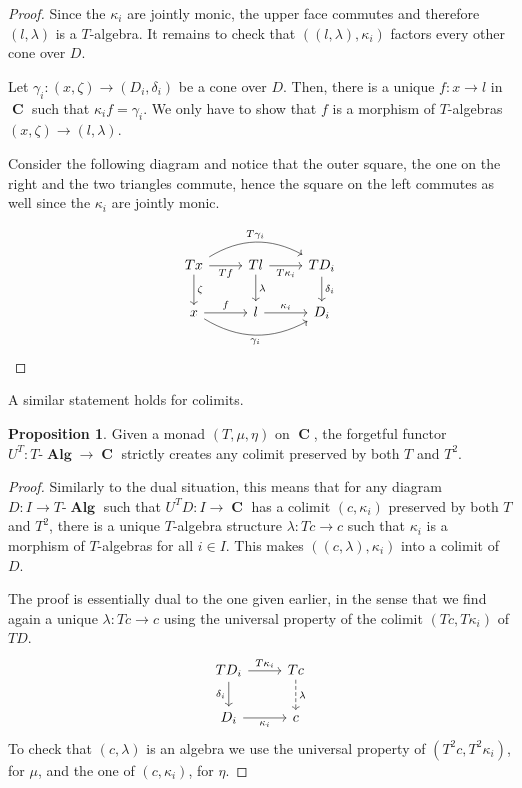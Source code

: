\documentclass[a4paper,11pt,twoside, openany]{book}
\DeclareMathOperator{\Alg}{\mathbf{Alg}}
\DeclareMathOperator{\C}{\mathbf{C}}
\theoremstyle{definition}
\theoremstyle{definition}
\newtheorem{prop}[thm]{Proposition}
\theoremstyle{remark}
\begin{document}
\begin{proof}
		Since the $\kappa_i$ are jointly monic, the upper face commutes and therefore $(l,\lambda)$ is a $T$-algebra. It remains to check that $((l,\lambda),\kappa_i)$ factors every other cone over $D$.
		
		Let $\gamma_i\colon(x,\zeta)\rightarrow (D_i,\delta_i)$ be a cone over $D$. Then, there is a unique $f\colon x\rightarrow l$ in $\C$ such that $\kappa_if=\gamma_i$. We only have to show that $f$ is a morphism of $T$-algebras $(x,\zeta)\rightarrow (l,\lambda)$.
		
		Consider the following diagram and notice that the outer square, the one on the right and the two triangles commute, hence the square on the left commutes as well since the $\kappa_i$ are jointly monic.
		
		\[
		\begin{tikzcd}
		Tx\ar[rr, bend left, "T\gamma_i"]\ar[r, swap, "Tf"]\ar[d, "\zeta"]
		& Tl\ar[r, swap, "T\kappa_i"]\ar[d, "\lambda"]
		& TD_i\ar[d, "\delta_i"] \\
		x\ar[r, "f"]\ar[rr, bend right, swap, "\gamma_i"]
		& l\ar[r, "\kappa_i"]
		& D_i
		\end{tikzcd}
		\]
	\end{proof}
	
	A similar statement holds for colimits.
	
	\begin{prop}\label{create colims}
		Given a monad $(T,\mu,\eta)$ on $\C$, the forgetful functor $U^T\colon T\mbox{-}\Alg\rightarrow\C$ strictly creates any colimit preserved by both $T$ and $T^2$.
	\end{prop}
	
	\begin{proof}
		Similarly to the dual situation, this means that for any diagram $D\colon I\rightarrow T\mbox{-}\Alg$ such that $U^TD\colon I\rightarrow\C$ has a colimit $(c,\kappa_i)$ preserved by both $T$ and $T^2$, there is a unique $T$-algebra structure $\lambda\colon Tc\rightarrow c$ such that $\kappa_i$ is a morphism of $T$-algebras for all $i\in I$. This makes $((c,\lambda),\kappa_i)$ into a colimit of $D$.
		
		The proof is essentially dual to the one given earlier, in the sense that we find again a unique $\lambda\colon Tc\rightarrow c$ using the universal property of the colimit $(Tc,T\kappa_i)$ of $TD$.
		\[
		\begin{tikzcd}
		TD_i\ar[r, "T\kappa_i"]\ar[d, "\delta_i"']
		& Tc\ar[d, dashed, "\lambda"] \\
		D_i\ar[r, "\kappa_i"']
		& c
		\end{tikzcd}
		\]
		To check that $(c,\lambda)$ is an algebra we use the universal property of $(T^2c,T^2\kappa_i)$, for $\mu$, and the one of $(c,\kappa_i)$, for $\eta$.
	\end{proof}
	
\end{document}
